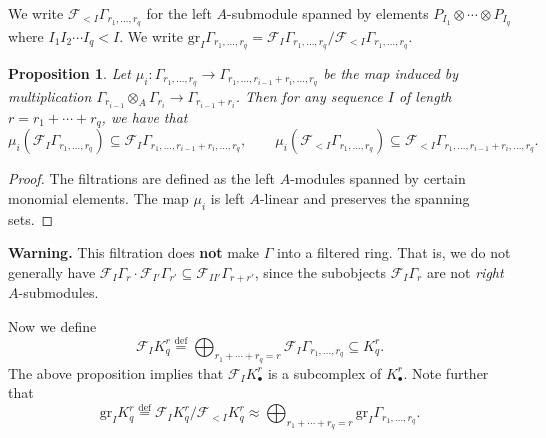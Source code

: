\documentclass[11pt]{amsart}
\numberwithin{equation}{section}
\theoremstyle{plain}
\newtheorem{prop}[subsection]{Proposition}
\theoremstyle{remark}
\theoremstyle{plain}
\begin{document}
We write ${\mathscr{F}}_{<I}\Gamma_{r_1,\dots,r_q}$ for the left $A$-submodule
spanned by elements $P_{I_1}\otimes\cdots\otimes P_{I_q}$ where
$I_1I_2\cdots I_q<I$.  We write ${\mathrm{gr}}_I\Gamma_{r_1,\dots,r_q}=
{\mathscr{F}}_{I}\Gamma_{r_1,\dots,r_q}/{\mathscr{F}}_{<I}\Gamma_{r_1,\dots,r_q}$.

\begin{prop}
Let $\mu_i\colon \Gamma_{r_1,\dots,r_q}{\rightarrow}
\Gamma_{r_1,\dots,r_{i-1}+r_i,\dots,r_q}$ be the map induced by
multiplication $\Gamma_{r_{i-1}}\otimes_A \Gamma_{r_i}{\rightarrow}
\Gamma_{r_{i-1}+r_i}$.  Then for any sequence $I$ of length
$r=r_1+\cdots+r_q$, we have that
\[
\mu_i({\mathscr{F}}_I\Gamma_{r_1,\dots,r_q})\subseteq
{\mathscr{F}}_{I}\Gamma_{r_1,\dots,r_{i-1}+r_i,\dots, r_q},\qquad
\mu_i({\mathscr{F}}_{<I}\Gamma_{r_1,\dots,r_q})\subseteq
{\mathscr{F}}_{<I}\Gamma_{r_1,\dots,r_{i-1}+r_i,\dots, r_q}.
\]
\end{prop}
\begin{proof}
The filtrations are defined as the left $A$-modules spanned by certain
monomial elements.  The map $\mu_i$ is left $A$-linear and preserves
the spanning sets.
\end{proof}

\textbf{Warning.}  This filtration does \textbf{not} make $\Gamma$ into a
filtered ring.  That is, we do not generally have ${\mathscr{F}}_I\Gamma_r\cdot
{\mathscr{F}}_{I'}\Gamma_{r'} \subseteq {\mathscr{F}}_{II'}\Gamma_{r+r'}$, since the
subobjects ${\mathscr{F}}_I\Gamma_r$ are not \emph{right} $A$-submodules.

Now we define 
\[
{\mathscr{F}}_I K_q^r {\overset{\mathrm{def}}=} \bigoplus_{r_1+\cdots+r_q=r}
{\mathscr{F}}_I\Gamma_{r_1,\dots,r_q} \subseteq K_q^r.
\]
The above proposition implies that ${\mathscr{F}}_IK_\bullet^r$ is a subcomplex
of $K_\bullet^r$.  Note further that
\[
{\mathrm{gr}}_I K_q^r {\overset{\mathrm{def}}=} {\mathscr{F}}_I K_q^r/{\mathscr{F}}_{<I}K_q^r \approx
\bigoplus_{r_1+\cdots+r_q=r} {\mathrm{gr}}_I 
\Gamma_{r_1,\dots,r_q}.
\]
\end{document}

